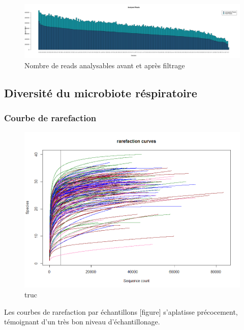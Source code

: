 \documentclass[12pt,a4paper]{article}
\begin{document}
\begin{figure}[ht]
\begin{center}
\includegraphics[scale=0.25]{img/pipeline.png}\hfill
\end{center}
\caption{Nombre de reads analysables avant et après filtrage}
\label{all}
\end{figure}




\subsection{Diversité du microbiote réspiratoire}

\subsubsection{Courbe de rarefaction}


\begin{figure}[!ht]
\begin{center}
\includegraphics[scale=0.5]{img/rarefaction.png}\hfill
\end{center}
\caption{truc}
\label{bach}
\end{figure}




Les courbes de rarefaction par échantillons [figure] s’aplatisse précocement, témoignant d’un très bon niveau d’échantillonage.
\end{document}
